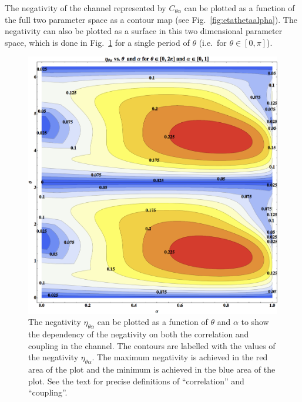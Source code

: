 The negativity of the channel represented by $C_{\theta\alpha}$ can be plotted as a function of the full two parameter space as a contour map (see Fig.\ \ref{fig:etathetaalpha}).  The negativity can also be plotted as a surface in this two dimensional parameter space, which is done in Fig.\ \ref{fig:etathetaalphaAlso} for a single period of $\theta$ (i.e.\ for $\theta\in[0,\pi]$).
\begin{figure}[h!t]
\centering
\includegraphics[scale=0.32]{eatthetaalphaII.png}
\caption{The negativity $\eta_{\theta\alpha}$ can be plotted as a function of $\theta$ and $\alpha$ to show the dependency of the negativity on both the correlation and coupling in the channel.  The contours are labelled with the values of the negativity $\eta_{\theta\alpha}$.  The maximum negativity is achieved in the red area of the plot and the minimum is achieved in the blue area of the plot.  See the text for precise definitions of ``correlation'' and ``coupling''. }
\label{fig:etathetaalphaAlso}
\end{figure}
